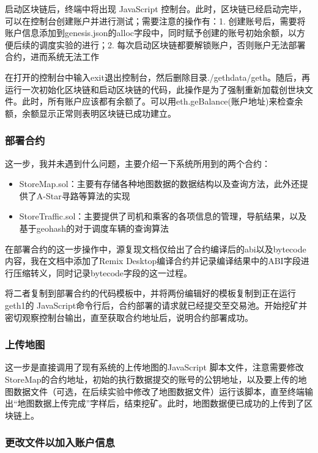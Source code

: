 启动区块链后，终端中将出现 JavaScript 控制台。此时，区块链已经启动完毕，可以在控制台创建账户并进行测试；需要注意的操作有：1. 创建账号后，需要将账户信息添加到genesis.json的alloc字段中，同时赋予创建的账号初始余额，以方便后续的调度实验的进行；2. 每次启动区块链都要解锁账户，否则账户无法部署合约，进而系统无法工作

在打开的控制台中输入exit退出控制台，然后删除目录./gethdata/geth。随后，再运行一次初始化区块链和启动区块链的代码，此操作是为了强制重新加载创世块文件。此时，所有账户应该都有余额了。可以用eth.geBalance(账户地址)来检查余额，余额显示正常则表明区块链已成功建立。

\subsubsection{部署合约}

这一步，我并未遇到什么问题，主要介绍一下系统所用到的两个合约：

\begin{itemize}
    \item StoreMap.sol：主要有存储各种地图数据的数据结构以及查询方法，此外还提供了A-Star寻路等算法的实现
    \item StoreTraffic.sol：主要提供了司机和乘客的各项信息的管理，导航结果，以及基于geohash的对于调度车辆的查询算法
\end{itemize}

在部署合约的这一步操作中，源复现文档仅给出了合约编译后的abi以及bytecode内容，我在文档中添加了Remix Desktop编译合约并记录编译结果中的ABI字段进行压缩转义，同时记录bytecode字段的这一过程。

将二者复制到部署合约的代码模板中，并将两份编辑好的模板复制到正在运行geth1的 JavaScript命令行后，合约部署的请求就已经提交至交易池。开始挖矿并密切观察控制台输出，直至获取合约地址后，说明合约部署成功。

\subsubsection{上传地图}

这一步是直接调用了现有系统的上传地图的JavaScript 脚本文件，注意需要修改StoreMap的合约地址，初始的执行数据提交的账号的公钥地址，以及要上传的地图数据文件（可选，在后续实验中修改了地图数据文件）运行该脚本，直至终端输出“地图数据上传完成”字样后，结束挖矿。此时，地图数据便已成功的上传到了区块链上。

\subsubsection{更改文件以加入账户信息}

